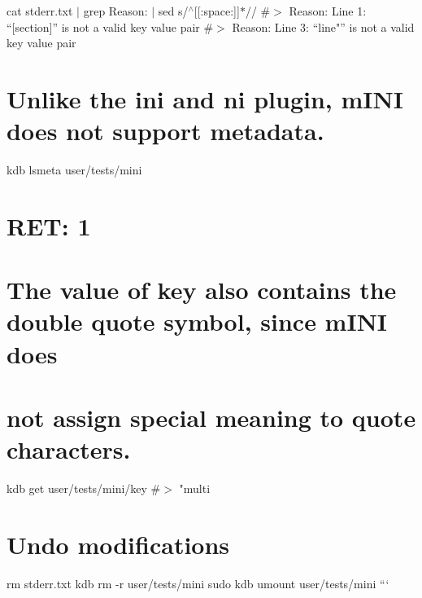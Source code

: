 cat stderr.\+txt $\vert$ grep \textquotesingle{}Reason\+:\textquotesingle{} $\vert$ sed \textquotesingle{}s/$^\wedge$\mbox{[}\mbox{[}\+:space\+:\mbox{]}\mbox{]}$\ast$//\textquotesingle{} \#$>$ Reason\+: Line 1\+: “\mbox{[}section\mbox{]}” is not a valid key value pair \#$>$ Reason\+: Line 3\+: “line"” is not a valid key value pair

\section*{Unlike the {\ttfamily ini} and {\ttfamily ni} plugin, m\+I\+NI does not support metadata.}

kdb lsmeta user/tests/mini \section*{R\+ET\+: 1}

\section*{The value of {\ttfamily key} also contains the double quote symbol, since m\+I\+NI does}

\section*{not assign special meaning to quote characters.}

kdb get user/tests/mini/key \#$>$ "multi

\section*{Undo modifications}

rm stderr.\+txt kdb rm -\/r user/tests/mini sudo kdb umount user/tests/mini ``` 